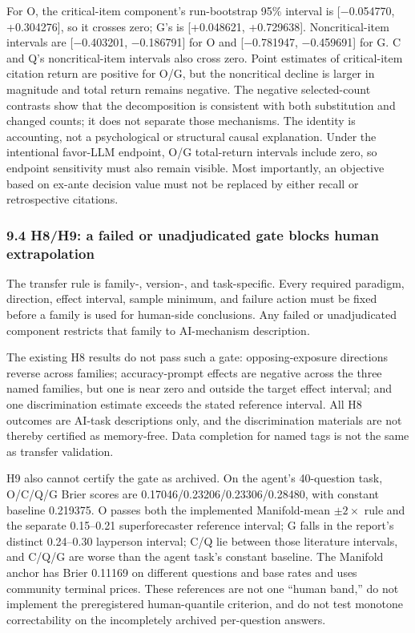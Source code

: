 \documentclass[
  11pt]{article}
\begin{document}
For O, the critical-item component's run-bootstrap 95\% interval is
{[}−0.054770, +0.304276{]}, so it crosses zero; G's is {[}+0.048621,
+0.729638{]}. Noncritical-item intervals are {[}−0.403201, −0.186791{]}
for O and {[}−0.781947, −0.459691{]} for G. C and Q's noncritical-item
intervals also cross zero. Point estimates of critical-item citation
return are positive for O/G, but the noncritical decline is larger in
magnitude and total return remains negative. The negative selected-count
contrasts show that the decomposition is consistent with both
substitution and changed counts; it does not separate those mechanisms.
The identity is accounting, not a psychological or structural causal
explanation. Under the intentional favor-LLM endpoint, O/G total-return
intervals include zero, so endpoint sensitivity must also remain
visible. Most importantly, an objective based on ex-ante decision value
must not be replaced by either recall or retrospective citations.

\subsubsection{9.4 H8/H9: a failed or unadjudicated gate blocks human
extrapolation}\label{h8h9-a-failed-or-unadjudicated-gate-blocks-human-extrapolation}

The transfer rule is family-, version-, and task-specific. Every
required paradigm, direction, effect interval, sample minimum, and
failure action must be fixed before a family is used for human-side
conclusions. Any failed or unadjudicated component restricts that family
to AI-mechanism description.

The existing H8 results do not pass such a gate: opposing-exposure
directions reverse across families; accuracy-prompt effects are negative
across the three named families, but one is near zero and outside the
target effect interval; and one discrimination estimate exceeds the
stated reference interval. All H8 outcomes are AI-task descriptions
only, and the discrimination materials are not thereby certified as
memory-free. Data completion for named tags is not the same as transfer
validation.

H9 also cannot certify the gate as archived. On the agent's 40-question
task, O/C/Q/G Brier scores are 0.17046/0.23206/0.23306/0.28480, with
constant baseline 0.219375. O passes both the implemented Manifold-mean
\(\pm2\times\) rule and the separate 0.15--0.21 superforecaster
reference interval; G falls in the report's distinct 0.24--0.30
layperson interval; C/Q lie between those literature intervals, and
C/Q/G are worse than the agent task's constant baseline. The Manifold
anchor has Brier 0.11169 on different questions and base rates and uses
community terminal prices. These references are not one ``human band,''
do not implement the preregistered human-quantile criterion, and do not
test monotone correctability on the incompletely archived per-question
answers.
\end{document}
